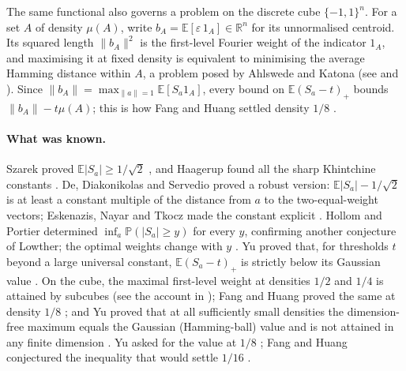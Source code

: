 \documentclass[11pt,a4paper]{article}
\numberwithin{equation}{section}
\theoremstyle{remark}
\newcommand{\E}{\mathbb E}
\newcommand{\PP}{\mathbb P}
\newcommand{\R}{\mathbb R}
\begin{document}
The same functional also governs a problem on the discrete cube
$\{-1,1\}^n$. For a set $A$ of density $\mu(A)$, write
$b_A=\E[\varepsilon\,1_A]\in\R^n$ for its unnormalised centroid. Its
squared length $\|b_A\|^2$ is the first-level Fourier weight of the
indicator $1_A$, and maximising it at fixed density is equivalent to
minimising the average Hamming distance within $A$, a problem posed by
Ahlswede and Katona \cite{AhlswedeKatona} (see \cite[Section~1]{FangHuang} and \cite[Section~I]{YuLevel}). Since
$\|b_A\|=\max_{\|a\|=1}\E[S_a1_A]$, every bound on $\E(S_a-t)_+$ bounds
$\|b_A\|-t\mu(A)$; this is how Fang and Huang settled density $1/8$
\cite{FangHuang}.

\paragraph{What was known.}
Szarek proved $\E|S_a|\ge1/\sqrt2$ \cite{Szarek}, and Haagerup found all
the sharp Khintchine constants \cite{Haagerup}. De, Diakonikolas and
Servedio \cite{DDS} proved a robust version: $\E|S_a|-1/\sqrt2$ is at least
a constant multiple of the distance from $a$ to the two-equal-weight vectors;
Eskenazis, Nayar and Tkocz made the constant explicit \cite{ENT}.
Hollom and Portier determined $\inf_a\PP(|S_a|\ge y)$ for every $y$,
confirming another conjecture of Lowther; the optimal weights change with
$y$ \cite{HP}. Yu proved that, for thresholds $t$ beyond a large universal
constant, $\E(S_a-t)_+$ is strictly below its Gaussian value
\cite[Theorem~4]{YuLevel}.
On the cube, the maximal first-level weight at densities $1/2$ and $1/4$ is
attained by subcubes \cite{AlthoferSillke,FuWeiYeung} (see the account in \cite[Section~1]{FangHuang}); Fang and Huang proved the
same at density $1/8$ \cite{FangHuang}; and Yu proved that at all
sufficiently small densities the dimension-free maximum equals the Gaussian
(Hamming-ball) value and is not attained in any finite dimension
\cite[Theorem~5]{YuLevel}. Yu asked for the value at $1/8$
\cite[Problem~2]{YuLevel}; Fang and Huang conjectured the inequality that
would settle $1/16$ \cite[Conjecture~3.1]{FangHuang}.
\end{document}
